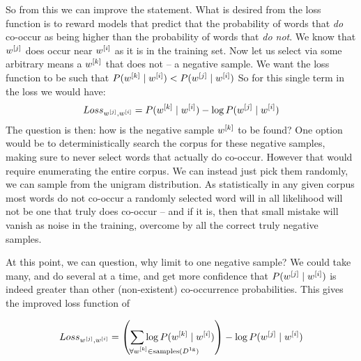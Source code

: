 \documentclass[parskip]{komatufte}
\begin{document}
So from this we can improve the statement.
What is desired from the loss function is to reward models that predict that  the probability of words that \emph{do} co-occur as being higher than the probability of words that \emph{do not}.
We know that $\n w_j$ does occur near $\n w_i$ as it is in the training set.
Now let us select via some arbitrary means a $\n w_k$ that does not -- a negative sample.
We want the loss function to be such that $P(\n w_k\mid \n w_i) < P(\n w_j\mid \n w_i)$
So for this single term in the loss we would have:
\begin{equation}
Loss_{\n w_j,\n w_i} =  P(\n w_k\mid \n w_i) - \log P(\n w_j\mid \n w_i)
\end{equation}
%
%
%
%
The question is then: how is the negative sample $\n w_k$ to be found?
One option would be to deterministically search the corpus for these negative samples, making sure to never select words that actually do co-occur.
However that would require enumerating the entire corpus.
We can instead just pick them randomly, we can sample from the unigram distribution.
As statistically in any given corpus most words do not co-occur 
a randomly selected word will in all likelihood will not be one that truly does co-occur
-- and if it is, then that small mistake will vanish as noise in the training,
overcome by all the correct truly negative samples.


At this point, we can question, why limit to one negative sample?
We could take many, and do several at a time,
and get more confidence that $P(\n w_j\mid \n w_i)$ is indeed greater than other (non-existent) co-occurrence probabilities.
This gives the improved loss function of 

\begin{equation}
Loss_{\n w_j,\n w_i} = 
\left(\sum_{\mathrlap{\!\!\!\!\!\!\forall \n w_k \in \text{samples}(\d D_{1g})}}
\log P(\n w_k\mid \n w_i) \right)
- \log P(\n w_j\mid \n w_i)
\end{equation}
\end{document}
